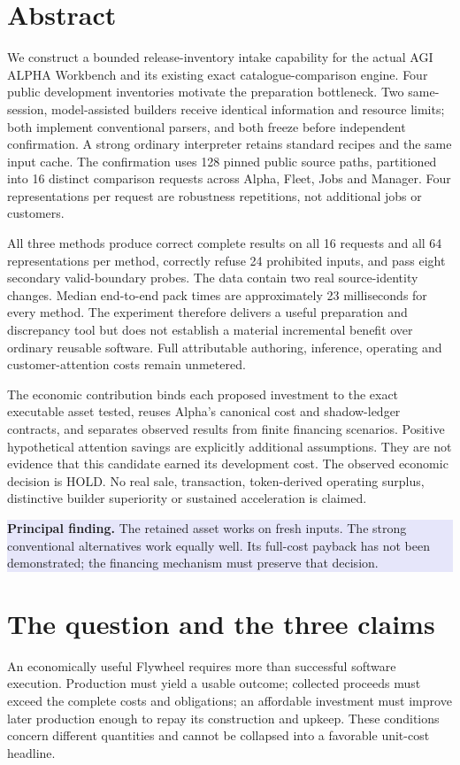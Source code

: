 \documentclass[11pt,a4paper]{article}
\newcommand{\note}[1]{\par\smallskip\noindent\colorbox{lavender}{\parbox{\dimexpr\linewidth-2\fboxsep}{\small #1}}\par\smallskip}
\begin{document}
\section*{Abstract}
We construct a bounded release-inventory intake capability for the actual AGI
ALPHA Workbench and its existing exact catalogue-comparison engine. Four public
development inventories motivate the preparation bottleneck. Two same-session,
model-assisted builders receive identical information and resource limits; both
implement conventional parsers, and both freeze before independent confirmation.
A strong ordinary interpreter retains standard recipes and the same input cache.
The confirmation uses 128 pinned public source paths, partitioned into 16 distinct
comparison requests across Alpha, Fleet, Jobs and Manager. Four representations
per request are robustness repetitions, not additional jobs or customers.

All three methods produce correct complete results on all 16 requests and all
64 representations per method, correctly refuse 24 prohibited inputs, and pass
eight secondary valid-boundary probes. The data contain two real source-identity
changes. Median end-to-end pack times are approximately 23 milliseconds for every
method. The experiment therefore delivers a useful preparation and discrepancy
tool but does not establish a material incremental benefit over ordinary reusable
software. Full attributable authoring, inference, operating and customer-attention
costs remain unmetered.

The economic contribution binds each proposed investment to the exact executable
asset tested, reuses Alpha's canonical cost and shadow-ledger contracts, and
separates observed results from finite financing scenarios. Positive hypothetical
attention savings are explicitly additional assumptions. They are not evidence
that this candidate earned its development cost. The observed economic decision
is HOLD. No real sale, transaction, token-derived operating surplus, distinctive
builder superiority or sustained acceleration is claimed.

\note{\textbf{Principal finding.} The retained asset works on fresh inputs. The
strong conventional alternatives work equally well. Its full-cost payback has
not been demonstrated; the financing mechanism must preserve that decision.}

\section{The question and the three claims}
An economically useful Flywheel requires more than successful software execution.
Production must yield a usable outcome; collected proceeds must exceed the complete
costs and obligations; an affordable investment must improve later production
enough to repay its construction and upkeep. These conditions concern different
quantities and cannot be collapsed into a favorable unit-cost headline.
\end{document}

